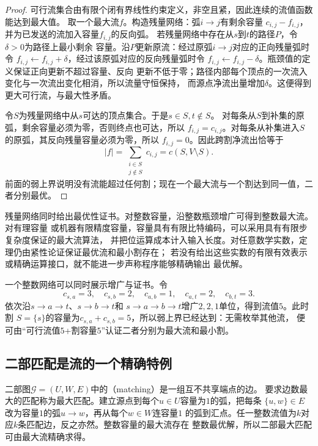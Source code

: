 \begin{proof}
可行流集合由有限个闭有界线性约束定义，非空且紧，因此连续的流值函数能达到最大值。
取一个最大流\(f\)。构造残量网络：弧\(i\to j\)有剩余容量
\(c_{i,j}-f_{i,j}\)，并为已发送的流加入容量\(f_{i,j}\)的反向弧。
若残量网络中存在从\(s\)到\(t\)的路径\(P\)，令\(\delta>0\)为路径上最小剩余
容量。沿\(P\)更新原流：经过原弧\(i\to j\)对应的正向残量弧时令
\(f_{i,j}\leftarrow f_{i,j}+\delta\)，经过该原弧对应的反向残量弧时令
\(f_{i,j}\leftarrow f_{i,j}-\delta\)。瓶颈值的定义保证正向更新不超过容量、反向
更新不低于零；路径内部每个顶点的一次流入变化与一次流出变化相消，所以流量守恒保持，
而源点净流出量增加\(\delta\)。这便得到更大可行流，与最大性矛盾。

令\(S\)为残量网络中从\(s\)可达的顶点集合。于是\(s\in S,t\notin S\)。
对每条从\(S\)到补集的原弧，剩余容量必须为零，否则终点也可达，所以
\(f_{i,j}=c_{i,j}\)。对每条从补集进入\(S\)的原弧，其反向残量容量必须为零，所以
\(f_{i,j}=0\)。因此跨割净流出恰等于
\[
  |f|=\sum_{\substack{i\in S\\j\notin S}}c_{i,j}
  =c(S,V\setminus S).
\]
前面的弱上界说明没有流能超过任何割；现在一个最大流与一个割达到同一值，二者分别最优。
\end{proof}

残量网络同时给出最优性证书。对整数容量，沿整数瓶颈增广可得到整数最大流。对有理容量
或机器有限精度容量，容量具有有限比特编码，可以采用具有有限步复杂度保证的最大流算法，
并把位运算成本计入输入长度。对任意数学实数，定理仍由紧性论证保证最优流和最小割存在；
若没有给出这些实数的有限有效表示或精确运算接口，就不能进一步声称程序能够精确输出
最优解。

一个整数网络可以同时展示增广与证书。令
\[
  c_{s,a}=3,\quad c_{s,b}=2,\quad c_{a,b}=1,\quad
  c_{a,t}=2,\quad c_{b,t}=3.
\]
依次沿\(s\to a\to t\)、\(s\to b\to t\)和
\(s\to a\to b\to t\)增广\(2,2,1\)单位，得到流值\(5\)。此时割
\(S=\{s\}\)的容量为\(c_{s,a}+c_{s,b}=5\)，所以弱上界已经达到：无需枚举其他流，
便可由“可行流值\(5\)+割容量\(5\)”认证二者分别为最大流和最小割。

\subsection{二部匹配是流的一个精确特例}

二部图\(\mathcal{G}=(U,W,E)\)中的（matching）是一组互不共享端点的边。
要求边数最大的匹配称为最大匹配。建立源点到每个\(u\in U\)容量为\(1\)的弧，把每条
\(\{u,w\}\in E\)改为容量\(1\)的弧\(u\to w\)，再从每个\(w\in W\)连容量\(1\)
的弧到汇点。任一整数流值为\(k\)对应\(k\)条匹配边，反之亦然。整数容量的最大流存在
整数最优解，所以二部最大匹配可由最大流精确求得。

